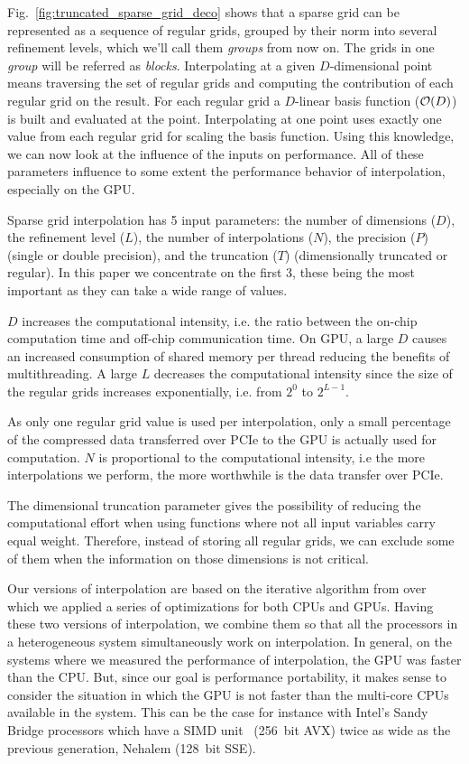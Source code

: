 Fig.~\ref{fig:truncated_sparse_grid_deco} shows that a sparse grid can be
represented as a sequence of regular grids, grouped by their norm into several
refinement levels, which we'll call them \textit{groups} from now on. The grids
in one \textit{group} will be referred as \textit{blocks}.
Interpolating at a given $D$-dimensional point means traversing the set of
regular grids and computing the contribution of each regular grid on the result. For
each regular grid a $D$-linear basis function ($\Otime{D}$) is built and
evaluated at the point. Interpolating at one point uses exactly one value from each
regular grid for scaling the basis function. Using this knowledge, we can now
look at the influence of the inputs on performance. All of these parameters
influence to some extent the performance behavior of interpolation, especially
on the GPU.

Sparse grid interpolation has 5 input parameters: the number of dimensions
($D$), the refinement level ($L$), the number of interpolations ($N$), the
precision ($P$) (single or double precision), and the truncation ($T$)
(dimensionally truncated or regular). In this paper we concentrate on the first
3, these being the most important as they can take a wide range of values.

$D$ increases the computational intensity, i.e. the ratio between the on-chip
computation time and off-chip communication time. On GPU, a large $D$ causes an
increased consumption of shared memory per thread reducing the benefits of
multithreading. A large $L$ decreases the computational intensity since the size
of the regular grids increases exponentially, i.e. from $2^0$ to $2^{L-1}$. 

As only one regular grid value is used per interpolation, only a small
percentage of the compressed data transferred over PCIe to the GPU is actually
used for computation. $N$ is proportional to the computational intensity, i.e
the more interpolations we perform, the more worthwhile is the data transfer over
PCIe.

The dimensional truncation parameter gives the possibility of reducing the
computational effort when using functions where not all input variables carry
equal weight. Therefore, instead of storing all regular grids, we can exclude
some of them when the information on those dimensions is not critical.

Our versions of interpolation are based on the iterative algorithm from
\cite{Murarasu:2011:CDS:1941553.1941559} over which we applied a series of
optimizations for both CPUs and GPUs. Having these two versions of
interpolation, we combine them so that all the processors in a heterogeneous
system simultaneously work on interpolation. In general, on the systems where we
measured the performance of interpolation, the GPU was faster than the CPU. But,
since our goal is performance portability, it makes sense to consider the
situation in which the GPU is not faster than the multi-core CPUs available in
the system. This can be the case for instance with Intel's Sandy Bridge
processors which have a SIMD unit~\cite{avx} (256~bit AVX) twice as wide as the
previous generation, Nehalem (128~bit SSE).
